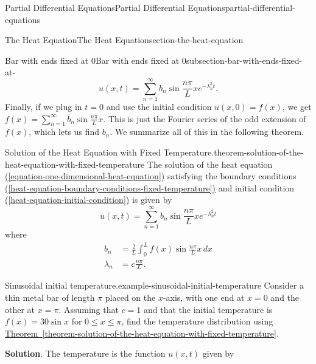 \documentclass[oneside,10pt,]{book}
\numberwithin{equation}{section}
\newcommand{\amp}{&}
\begin{document}
\begin{chapterptx}{Partial Differential Equations}{}{Partial Differential Equations}{}{}{partial-differential-equations}
\begin{sectionptx}{The Heat Equation}{}{The Heat Equation}{}{}{section-the-heat-equation}
\begin{subsectionptx}{Bar with ends fixed at \(0\)}{}{Bar with ends fixed at \(0\)}{}{}{subsection-bar-with-ends-fixed-at-}
%
\begin{equation*}
u(x,t) = \sum_{n=1}^{\infty}b_{n}\sin\frac{n\pi}{L}x e^{-\lambda^{2}_{n}t}.
\end{equation*}
\hypertarget{p-694}{}%
Finally, if we plug in \(t=0\) and use the initial condition \(u(x,0) = f(x)\), we get \(f(x) = \sum_{n=1}^{\infty}b_{n}\sin\frac{n\pi}{L}x\). This is just the Fourier series of the odd extension of \(f(x)\), which lets us find \(b_{n}\). We summarize all of this in the following theorem.%
\begin{theorem}{Solution of the Heat Equation with Fixed Temperature.}{}{theorem-solution-of-the-heat-equation-with-fixed-temperature}%
\hypertarget{p-695}{}%
The solution of the heat equation \hyperref[equation-one-dimensional-heat-equation]{(\ref{equation-one-dimensional-heat-equation})} satisfying the boundary conditions \hyperref[heat-equation-boundary-conditions-fixed-temperature]{(\ref{heat-equation-boundary-conditions-fixed-temperature})} and initial condition \hyperref[heat-equation-initial-condition]{(\ref{heat-equation-initial-condition})} is given by%
\begin{equation}
u(x,t) = \sum_{n=1}^{\infty}b_{n}\sin\frac{n\pi}{L}x e^{-\lambda^{2}_{n}t}\label{heat-equation-fixed-ends-solution}
\end{equation}
where%
\begin{align}
b_{n} \amp = \frac{2}{L}\int_{0}^{L}f(x)\sin\frac{n\pi}{L}x\,dx \label{heat-equation-fixed-ends-solution-coeff}\\
\lambda_{n} \amp = c\frac{n\pi}{L}. \label{heat-equation-fixed-ends-solution-exponent}
\end{align}
%
\end{theorem}
\begin{example}{Sinusoidal initial temperature.}{example-sinusoidal-initial-temperature}%
\hypertarget{p-696}{}%
Consider a thin metal bar of length \(\pi\) placed on the \(x\)-axis, with one end at \(x=0\) and the other at \(x=\pi\). Assuming that \(c=1\) and that the initial temperature is \(f(x) = 30\sin x\) for \(0\leq x\leq\pi\), find the temperature distribution using \hyperref[theorem-solution-of-the-heat-equation-with-fixed-temperature]{Theorem~\ref{theorem-solution-of-the-heat-equation-with-fixed-temperature}}.%
\par\smallskip%
\noindent\textbf{Solution}.\hypertarget{solution-97}{}\quad%
\hypertarget{p-697}{}%
The temperature is the function \(u(x,t)\) given by%
\begin{equation*}

\end{equation*}
\end{example}
\end{subsectionptx}
\end{sectionptx}
\end{chapterptx}
\end{document}
